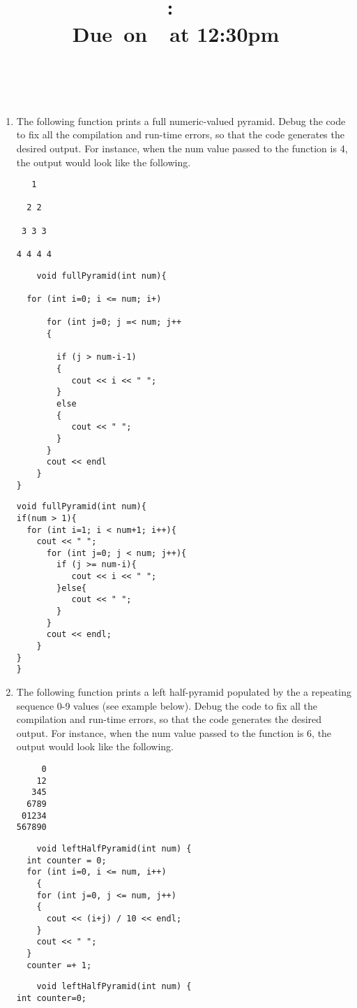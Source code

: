 \documentclass{article}
\title{
    \vspace{2in}
    \textmd{\textbf{\hmwkClass:\ \hmwkTitle}}\\
    \normalsize\vspace{0.1in}\small{Due\ on\ \hmwkDueDate\ at 12:30pm}\\
    \vspace{0.1in}\large{\textit{\hmwkClassInstructor\ \hmwkClassTime}}
    \vspace{3in}
}
\author{\hmwkAuthorName}
\date{}
\begin{document}


\begin{enumerate}
	\item The following function prints a full numeric-valued pyramid. Debug the code to fix all the compilation and run-time errors, so that the code generates the desired output. For instance, when the num value passed to the function is 4, the output would look like the following.
\begin{lstlisting}
   1 

  2 2 

 3 3 3 

4 4 4 4	
\end{lstlisting}
\begin{lstlisting}
	void fullPyramid(int num){

  for (int i=0; i <= num; i+)

      for (int j=0; j =< num; j++
      {

        if (j > num-i-1)
        {
           cout << i << " ";
        }
        else
        {
           cout << " ";
        }
      }
      cout << endl
    }
} 
\end{lstlisting}

\begin{lstlisting}
void fullPyramid(int num){
if(num > 1){
  for (int i=1; i < num+1; i++){
    cout << " ";
      for (int j=0; j < num; j++){
        if (j >= num-i){
           cout << i << " ";
        }else{
           cout << " ";
        }
      }
      cout << endl;
    }
}
}
\end{lstlisting}
\item The following function prints a left half-pyramid populated by the a repeating sequence 0-9 values (see example below). Debug the code to fix all the compilation and run-time errors, so that the code generates the desired output. For instance, when the num value passed to the function is 6, the output would look like the following.
\begin{lstlisting}
	 0
    12
   345
  6789
 01234
567890
\end{lstlisting}
\begin{lstlisting}
	void leftHalfPyramid(int num) {
  int counter = 0;
  for (int i=0, i <= num, i++) 
    { 
    for (int j=0, j <= num, j++) 
    { 
      cout << (i+j) / 10 << endl;
    } 
    cout << " "; 
  }
  counter =+ 1;
\end{lstlisting}
\begin{lstlisting}
	void leftHalfPyramid(int num) {
int counter=0;


\end{lstlisting}
\end{enumerate}
\end{document}
